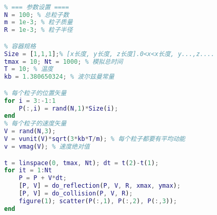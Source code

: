 \begin{lstlisting}[language=matlab]
%麦克斯韦-波尔兹曼分布

% === 参数设置 ====
N = 100; % 总粒子数
m = 1e-3; % 粒子质量
R = 1e-3; % 粒子半径

% 容器规格
Size = [1,1,1];% [x长度, y长度, z长度].0<x<x长度, y...,z....
tmax = 10; Nt = 1000; % 模拟总时间
T = 10; % 温度
kb = 1.380650324; % 波尔兹曼常量

% 每个粒子的位置矢量
for i = 3:-1:1
    P(:,i) = rand(N,1)*Size(i);
end
% 每个粒子的速度矢量
V = rand(N,3);
V = vunit(V)*sqrt(3*kb*T/m); % 每个粒子都要有平均动能
v = vmag(V); % 速度绝对值

t = linspace(0, tmax, Nt); dt = t(2)-t(1);
for it = 1:Nt
    P = P + V*dt;
    [P, V] = do_reflection(P, V, R, xmax, ymax);
    [P, V] = do_collision(P, V, R);
    figure(1); scatter(P(:,1), P(:,2), P(:,3));
end
\end{lstlisting}
